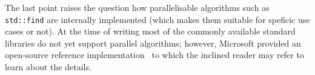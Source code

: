 \noindent The last point raises the question how parallelisable algorithms such as \texttt{std::find} are internally implemented (which makes them suitable for speficic use cases or not). At the time of writing most of the commonly available standard libraries do not yet support parallel algorithms; however, Microsoft provided an open-source reference implementation~\cite{parallel_stl} to which the inclined reader may refer to learn about the details.